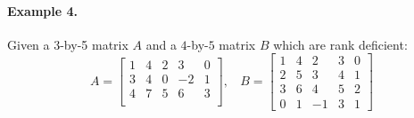     \paragraph{Example 4.} Given a 3-by-5 matrix $A$ and a $4$-by-$5$ matrix $B$ which are rank deficient:
        \begin{displaymath}
            A = \begin{bmatrix}
                1 & 4 & 2 & 3 & 0\\
                3 & 4 & 0 & -2 & 1\\
                4 & 7 & 5 & 6 & 3\\
            \end{bmatrix}, \ \ \ \
            B = \begin{bmatrix}
                1 & 4 & 2 & 3 & 0\\
                2 & 5 & 3 & 4 & 1 \\
                3 & 6 & 4 & 5 & 2\\
                0 & 1 & -1 & 3 & 1
            \end{bmatrix}
        \end{displaymath}
    
